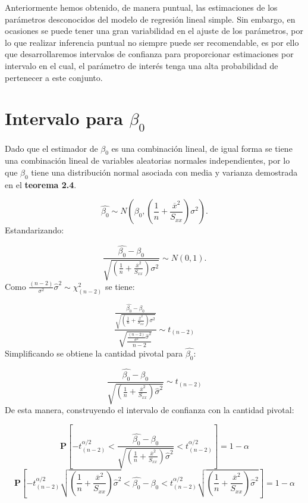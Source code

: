 \documentclass[
  a4paper,
  oneside,
  openany]{book}
\begin{document}
Anteriormente hemos obtenido, de manera puntual, las estimaciones de los parámetros desconocidos del modelo de regresión lineal simple. Sin embargo, en ocasiones se puede tener una gran variabilidad en el ajuste de los parámetros, por lo que realizar inferencia puntual no siempre puede ser recomendable, es por ello que desarrollaremos intervalos de confianza para proporcionar estimaciones por intervalo en el cual, el parámetro de interés tenga una alta probabilidad de pertenecer a este conjunto.

\hypertarget{intervalo-para-beta_0}{%
\section{\texorpdfstring{Intervalo para \(\beta_{0}\)}{Intervalo para \textbackslash beta\_\{0\}}}\label{intervalo-para-beta_0}}

Dado que el estimador de \(\beta_{0}\) es una combinación lineal, de igual forma se tiene una combinación lineal de variables aleatorias normales independientes, por lo que \(\beta_{0}\) tiene una distribución normal asociada con media y varianza demostrada en el \textbf{teorema 2.4}.

\[\hat{\beta_{0}} \sim N \left( \beta_{0},\left(\frac{1}{n}+\frac{\overline{x}^2}{S_{xx}}\right)\sigma^2\right).\]
Estandarizando:

\[\frac{\hat{\beta_{0}}-\beta_{0}}{\sqrt{\left(\frac{1}{n}+\frac{\overline{x}^2}{S_{xx}}\right)\sigma^2}}\sim N (0,1).\]
Como \(\frac{(n-2)}{\sigma^2}\hat{\sigma}^2\sim\chi^2_{(n-2)}\) se tiene:

\[\frac{\frac{\hat{\beta_{0}}-\beta_{0}}{\sqrt{\left(\frac{1}{n}+\frac{\overline{x}^2}{S_{xx}}\right)\sigma^2}}}{\sqrt{\frac{\frac{(n-2)}{\sigma^2}\hat{\sigma}^2}{n-2}}}\sim t_{(n-2)}\]
Simplificando se obtiene la cantidad pivotal para \(\hat{\beta_{0}}:\)

\[\frac{\hat{\beta_{0}}-\beta_{0}}{\sqrt{\left(\frac{1}{n}+\frac{\overline{x}^2}{S_{xx}}\right)\hat{\sigma}^2}} \sim t_{(n-2)}\]
De esta manera, construyendo el intervalo de confianza con la cantidad pivotal:

\[\mathbf{P}\left[-t^{\alpha/2}_{(n-2)}<\frac{\hat{\beta_{0}}-\beta_{0}}{\sqrt{\left(\frac{1}{n}+\frac{\overline{x}^2}{S_{xx}}\right)\hat{\sigma}^2}}< t^{\alpha/2}_{(n-2)}\right]=1-\alpha\]
\[\mathbf{P}\left[-t^{\alpha/2}_{(n-2)}\sqrt{\left(\frac{1}{n}+\frac{\overline{x}^2}{S_{xx}}\right)\hat{\sigma}^2}<\hat{\beta_{0}}-\beta_{0}< t^{\alpha/2}_{(n-2)}\sqrt{\left(\frac{1}{n}+\frac{\overline{x}^2}{S_{xx}}\right)\hat{\sigma}^2}\right]=1-\alpha\]
\end{document}
